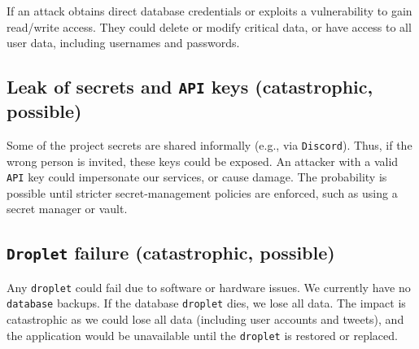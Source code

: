 If an attack obtains direct database credentials or exploits a 
vulnerability to gain read/write access. They could delete or modify 
critical data, or have access to all user data, including usernames 
and passwords.

\subsection{Leak of secrets and \texttt{API} keys (catastrophic, possible)}

Some of the project secrets are shared informally (e.g., via \texttt{Discord}). 
Thus, if the wrong person is invited, these keys could be exposed. 
An attacker with a valid \texttt{API} key could impersonate our services, 
or cause damage. The probability is possible until stricter 
secret-management policies are enforced, 
such as using a secret manager or vault.

\subsection{\texttt{Droplet} failure (catastrophic, possible)}
Any \texttt{droplet} could fail due to software or hardware issues. We currently have 
no \texttt{database} backups. If the database \texttt{droplet} dies, we lose all data. 
The impact is catastrophic as we could lose all data (including user accounts 
and tweets), and the application would be unavailable until the \texttt{droplet} is 
restored or replaced.